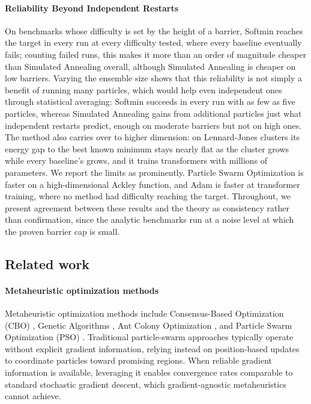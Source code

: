 \documentclass{article}
\theoremstyle{plain}
\theoremstyle{definition}
\theoremstyle{remark}
\begin{document}
\paragraph{Reliability Beyond Independent Restarts} On benchmarks whose difficulty is set by the height of a barrier, Softmin reaches the target in every run at every difficulty tested, where every baseline eventually fails; counting failed runs, this makes it more than an order of magnitude cheaper than Simulated Annealing overall, although Simulated Annealing is cheaper on low barriers. Varying the ensemble size shows that this reliability is not simply a benefit of running many particles, which would help even independent ones through statistical averaging: Softmin succeeds in every run with as few as five particles, whereas Simulated Annealing gains from additional particles just what independent restarts predict, enough on moderate barriers but not on high ones. The method also carries over to higher dimension: on Lennard-Jones clusters its energy gap to the best known minimum stays nearly flat as the cluster grows while every baseline's grows, and it trains transformers with millions of parameters. We report the limits as prominently. Particle Swarm Optimization is faster on a high-dimensional Ackley function, and Adam is faster at transformer training, where no method had difficulty reaching the target. Throughout, we present agreement between these results and the theory as consistency rather than confirmation, since the analytic benchmarks run at a noise level at which the proven barrier cap is small.

\subsection{Related work}

\paragraph{Metaheuristic optimization methods}
Metaheuristic optimization methods include Consensus-Based Optimization (CBO) \cite{CarrilloChoiTotzeckTse2018,fornasier2024consensus,pinnau2017consensus, carrillo2021consensus}, Genetic Algorithms \cite{Goldberg1989}, Ant Colony Optimization \cite{DorigoStutzle2004}, and Particle Swarm Optimization (PSO) \cite{kennedy1995particle, noel2012new}. Traditional particle-swarm approaches typically operate without explicit gradient information, relying instead on position-based updates to coordinate particles toward promising regions. When reliable gradient information is available, leveraging it enables convergence rates comparable to standard stochastic gradient descent, which gradient-agnostic metaheuristics cannot achieve.
\end{document}
